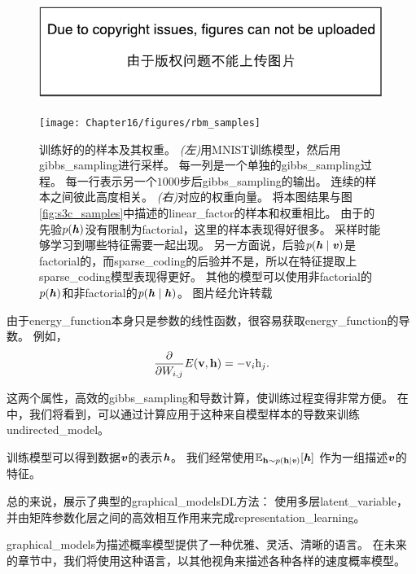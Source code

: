 \begin{figure}[!htb]
\ifOpenSource
\centerline{\includegraphics{figure.pdf}}
\else
	\centerline{\texttt{[image: Chapter16/figures/rbm\_samples]}}	
\fi
\caption{训练好的的样本及其权重。
\emph{(左)}用MNIST训练模型，然后用\gls{gibbs_sampling}进行采样。
每一列是一个单独的\gls{gibbs_sampling}过程。
每一行表示另一个$1000$步后\gls{gibbs_sampling}的输出。
连续的样本之间彼此高度相关。
\emph{(右)}对应的权重向量。
将本图结果与图\ref{fig:s3c_samples}中描述的\gls{linear_factor}的样本和权重相比。
由于的先验$p(\boldsymbol{\mathit{h}})$没有限制为\gls{factorial}，这里的样本表现得好很多。
采样时能够学习到哪些特征需要一起出现。
另一方面说，后验$p(\boldsymbol{\mathit{h}} \mid \boldsymbol{\mathit{v}})$是\gls{factorial}的，而\gls{sparse_coding}的后验并不是，所以在特征提取上\gls{sparse_coding}模型表现得更好。
其他的模型可以使用非\gls{factorial}的$p(\boldsymbol{\mathit{h}})$和非\gls{factorial}的$p(\boldsymbol{\mathit{h}} \mid \boldsymbol{\mathit{h}})$。
图片经\citet{lisa_tutorial_rbm}允许转载}
\label{fig:rbm_sample}
\end{figure}


由于\gls{energy_function}本身只是参数的线性函数，很容易获取\gls{energy_function}的导数。 例如，
\begin{align}
\label{eqn:1615}
\frac{\partial}{\partial W_{i,j}} E(\mathbf{v},\mathbf{h}) = - \mathrm{v}_i \mathrm{h}_j.
\end{align}


这两个属性，高效的\gls{gibbs_sampling}和导数计算，使训练过程变得非常方便。
在中，我们将看到，可以通过计算应用于这种来自模型样本的导数来训练\gls{undirected_model}。

训练模型可以得到数据$\boldsymbol{\mathit{v}}$的表示$\boldsymbol{\mathit{h}}$。
我们经常使用$\mathbb{E}_{\mathbf{h}\sim p(\mathbf{h}\mid\boldsymbol{\mathit{v}})}[\boldsymbol{\mathit{h}}]$ 作为一组描述$\boldsymbol{\mathit{v}}$的特征。



总的来说，展示了典型的\gls{graphical_models}\gls{DL}方法：
使用多层\gls{latent_variable}，并由矩阵参数化层之间的高效相互作用来完成\gls{representation_learning}。


\gls{graphical_models}为描述概率模型提供了一种优雅、灵活、清晰的语言。 
在未来的章节中，我们将使用这种语言，以其他视角来描述各种各样的速度概率模型。




